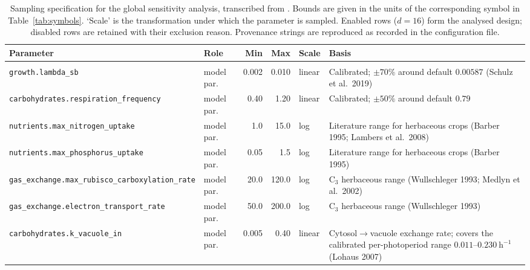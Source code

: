 \documentclass[a4paper,fleqn]{cas-sc}
\begin{document}
\begin{table}[!htbp]
\centering
\footnotesize
\caption{Sampling specification for the global sensitivity analysis,
transcribed from \protect{}. Bounds are given in
the units of the corresponding symbol in Table~\ref{tab:symbols}. `Scale'
is the transformation under which the parameter is sampled. Enabled rows
($d=16$) form the analysed design; disabled rows are retained with their
exclusion reason. Provenance strings are reproduced as recorded in the
configuration file.}
\label{tab:sa_params}
\footnotesize
\setlength{\tabcolsep}{3.5pt}
\begin{tabular}{@{}@{}>{\raggedright\arraybackslash}p{}lrrl>{\raggedright\arraybackslash}p{}@{}}
\toprule
Parameter & Role & Min & Max & Scale & Basis \\
\midrule
\multicolumn{6}{@{}l}{\emph{Enabled: analysed dimensions} ($d=16$)}\\
\texttt{growth.\allowbreak lambda\_\allowbreak sb}                    & model par.\ & 0.002  & 0.010  & linear & Calibrated; $\pm70\%$ around default $0.00587$ (Schulz et al.\ 2019) \\
\texttt{carbohydrates.\allowbreak respiration\_\allowbreak frequency} & model par.\ & 0.40   & 1.20   & linear & Calibrated; $\pm50\%$ around default $0.79$ \\
\texttt{nutrients.\allowbreak max\_\allowbreak nitrogen\_\allowbreak uptake}      & model par.\ & 1.0    & 15.0   & log    & Literature range for herbaceous crops (Barber 1995; Lambers et al.\ 2008) \\
\texttt{nutrients.\allowbreak max\_\allowbreak phosphorus\_\allowbreak uptake}    & model par.\ & 0.05   & 1.5    & log    & Literature range for herbaceous crops (Barber 1995) \\
\texttt{gas\_\allowbreak exchange.\allowbreak max\_\allowbreak rubisco\_\allowbreak carboxylation\_\allowbreak rate} & model par.\ & 20.0 & 120.0 & log & C$_3$ herbaceous range (Wullschleger 1993; Medlyn et al.\ 2002) \\
\texttt{gas\_\allowbreak exchange.\allowbreak electron\_\allowbreak transport\_\allowbreak rate} & model par.\ & 50.0 & 200.0 & log & C$_3$ herbaceous range (Wullschleger 1993) \\
\texttt{carbohydrates.\allowbreak k\_\allowbreak vacuole\_\allowbreak in}         & model par.\ & 0.005  & 0.40   & linear & Cytosol$\to$vacuole exchange rate; covers the calibrated per-photoperiod range $0.011$--$0.230\ \mathrm{h^{-1}}$ (Lohaus 2007) \\

\end{tabular}
\end{table}
\end{document}
